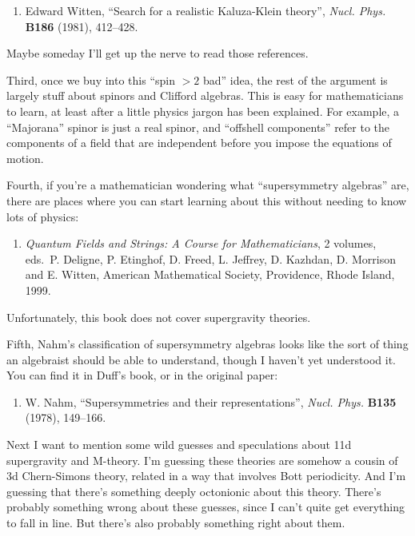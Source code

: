 \documentclass{article}
\def\tightlist{}
\begin{document}
\begin{enumerate}
\def\labelenumi{\arabic{enumi})}
\setcounter{enumi}{1}
\tightlist
\item
  Edward Witten, ``Search for a realistic Kaluza-Klein theory'',
  \emph{Nucl. Phys.} \textbf{B186} (1981), 412--428.
\end{enumerate}

Maybe someday I'll get up the nerve to read those references.

Third, once we buy into this ``spin \(> 2\) bad'' idea, the rest of the
argument is largely stuff about spinors and Clifford algebras. This is
easy for mathematicians to learn, at least after a little physics jargon
has been explained. For example, a ``Majorana'' spinor is just a real
spinor, and ``offshell components'' refer to the components of a field
that are independent before you impose the equations of motion.

Fourth, if you're a mathematician wondering what ``supersymmetry
algebras'' are, there are places where you can start learning about this
without needing to know lots of physics:

\begin{enumerate}
\def\labelenumi{\arabic{enumi})}
\setcounter{enumi}{2}
\tightlist
\item
  \emph{Quantum Fields and Strings: A Course for Mathematicians}, 2
  volumes, eds.~P. Deligne, P. Etinghof, D. Freed, L. Jeffrey, D.
  Kazhdan, D. Morrison and E. Witten, American Mathematical Society,
  Providence, Rhode Island, 1999.
\end{enumerate}

Unfortunately, this book does not cover supergravity theories.

Fifth, Nahm's classification of supersymmetry algebras looks like the
sort of thing an algebraist should be able to understand, though I
haven't yet understood it. You can find it in Duff's book, or in the
original paper:

\begin{enumerate}
\def\labelenumi{\arabic{enumi})}
\setcounter{enumi}{3}
\tightlist
\item
  W. Nahm, ``Supersymmetries and their representations'', \emph{Nucl.
  Phys.} \textbf{B135} (1978), 149--166.
\end{enumerate}

Next I want to mention some wild guesses and speculations about 11d
supergravity and M-theory. I'm guessing these theories are somehow a
cousin of 3d Chern-Simons theory, related in a way that involves Bott
periodicity. And I'm guessing that there's something deeply octonionic
about this theory. There's probably something wrong about these guesses,
since I can't quite get everything to fall in line. But there's also
probably something right about them.
\end{document}
